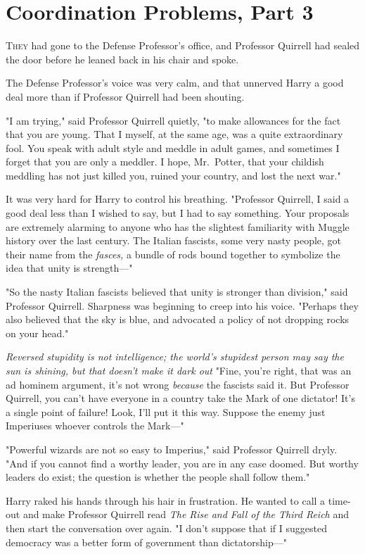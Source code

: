 \chapter{Coordination Problems, Part 3}

\lettrine{T}{hey} had gone to
the Defense Professor's office, and Professor Quirrell had sealed the door
before he leaned back in his chair and spoke.

The Defense Professor's voice was very calm, and that unnerved Harry a good
deal more than if Professor Quirrell had been shouting.

"I am trying," said Professor Quirrell quietly, "to make allowances for the
fact that you are young. That I myself, at the same age, was a quite
extraordinary fool. You speak with adult style and meddle in adult games, and
sometimes I forget that you are only a meddler. I hope, Mr.~Potter, that your
childish meddling has not just killed you, ruined your country, and lost the
next war."

It was very hard for Harry to control his breathing. "Professor Quirrell, I
said a good deal less than I wished to say, but I had to say something. Your
proposals are extremely alarming to anyone who has the slightest familiarity
with Muggle history over the last century. The Italian fascists, some very
nasty people, got their name from the \emph{fasces,} a bundle of rods bound
together to symbolize the idea that unity is strength—"

"So the nasty Italian fascists believed that unity is stronger than division,"
said Professor Quirrell. Sharpness was beginning to creep into his voice.
"Perhaps they also believed that the sky is blue, and advocated a policy of not
dropping rocks on your head."

\emph{Reversed stupidity is not intelligence; the world's stupidest person may
say the sun is shining, but that doesn't make it dark out{\el}} "Fine,
you're right, that was an ad hominem argument, it's not wrong \emph{because}
the fascists said it. But Professor Quirrell, you can't have everyone in a
country take the Mark of one dictator! It's a single point of failure! Look,
I'll put it this way. Suppose the enemy just Imperiuses whoever controls the
Mark—"

"Powerful wizards are not so easy to Imperius," said Professor Quirrell dryly.
"And if you cannot find a worthy leader, you are in any case doomed. But worthy
leaders do exist; the question is whether the people shall follow them."

Harry raked his hands through his hair in frustration. He wanted to call a
time-out and make Professor Quirrell read \emph{The Rise and Fall of the Third
Reich} and then start the conversation over again. "I don't suppose that if I
suggested democracy was a better form of government than dictatorship—"

